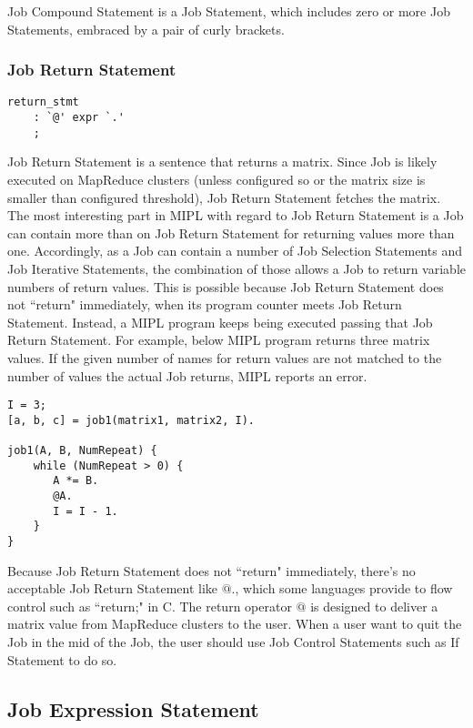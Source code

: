 \documentclass[prodmode,acmtecs]{acmsmall}
\begin{document}
Job Compound Statement is a Job Statement, which includes
zero or more Job Statements, embraced by a pair of curly
brackets.

\subsubsection{Job Return Statement}

\begin{lstlisting}
return_stmt
	: `@' expr `.'
	;

\end{lstlisting}

Job Return Statement is a sentence that returns a matrix.  Since
Job is likely executed on MapReduce clusters (unless configured
so or the matrix size is smaller than configured threshold), Job
Return Statement fetches the matrix.  The most interesting part
in MIPL with regard to Job Return Statement is a Job can contain
more than on Job Return Statement for returning values more than
one.  Accordingly, as a Job can contain a number of Job Selection
Statements and Job Iterative Statements, the combination of those
allows a Job to return variable numbers of return values. This is
possible because Job Return Statement does not ``return" immediately,
when its program counter meets Job Return Statement.  Instead, a
MIPL program keeps being executed passing that Job Return Statement.
For example, below MIPL program returns three matrix values.  If
the given number of names for return values are not matched to the
number of values the actual Job returns, MIPL reports an error.

\begin{lstlisting}
I = 3;
[a, b, c] = job1(matrix1, matrix2, I).

job1(A, B, NumRepeat) {
    while (NumRepeat > 0) {
       A *= B.
       @A.
       I = I - 1. 
    }
}
\end{lstlisting}

Because Job Return Statement does not ``return" immediately,
there's no acceptable Job Return Statement like $@.$, which some
languages provide to flow control such as ``return;" in C.  The
return operator $@$ is designed to deliver a matrix value from
MapReduce clusters to the user.  When a user want to quit the Job
in the mid of the Job, the user should use Job Control Statements
such as If Statement to do so.


\subsection{Job Expression Statement}
\end{document}
